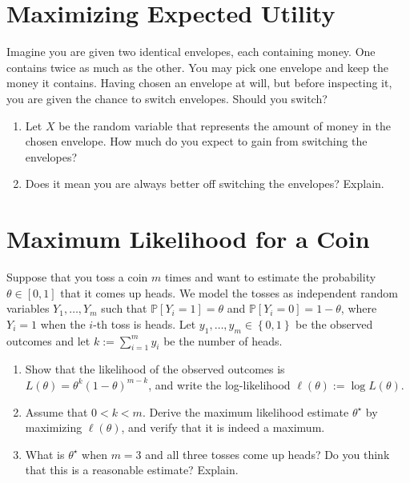 \documentclass[letterpaper]{article}
\newcommand{\opt}{^\star}
\begin{document}
\section{Maximizing Expected Utility}

Imagine you are given two identical envelopes, each containing money. One contains twice as much as the other. You may pick one envelope and keep the money it contains. Having chosen an envelope at will, but before inspecting it, you are given the chance to switch envelopes. Should you switch?

\begin{enumerate}
\item Let $X$ be the random variable that represents the amount of money in the chosen envelope. How much do you expect to gain from switching the envelopes?
\item Does it mean you are always better off switching the envelopes? Explain.
\end{enumerate}


\section{Maximum Likelihood for a Coin}
Suppose that you toss a coin $m$ times and want to estimate the probability $\theta \in [0,1]$ that it comes up heads. We model the tosses as independent random variables $Y_1, \dots, Y_m$ such that $\mathbb{P}[Y_i = 1] = \theta$ and $\mathbb{P}[Y_i = 0] = 1 - \theta$, where $Y_i = 1$ when the $i$-th toss is heads. Let $y_1, \dots, y_m \in \left\{ 0,1 \right\}$ be the observed outcomes and let $k := \sum_{i=1}^m y_i$ be the number of heads.
\begin{enumerate}
\item Show that the likelihood of the observed outcomes is $L(\theta) = \theta^k (1-\theta)^{m-k}$, and write the log-likelihood $\ell(\theta) := \log L(\theta)$.
\item Assume that $0 < k < m$. Derive the maximum likelihood estimate $\theta\opt$ by maximizing $\ell(\theta)$, and verify that it is indeed a maximum.
\item What is $\theta\opt$ when $m = 3$ and all three tosses come up heads? Do you think that this is a reasonable estimate? Explain.
\end{enumerate}
\end{document}
